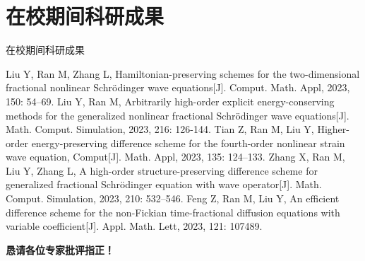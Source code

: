 \documentclass[aspectratio=169]{beamer}
\numberwithin{theorem}{section} %
\begin{document}
\section*{在校期间科研成果}
\begin{frame}{在校期间科研成果}\footnotesize
	\begin{thebibliography}{99}  
	 Liu Y, Ran M, Zhang L, Hamiltonian-preserving schemes for the two-dimensional fractional nonlinear Schrödinger wave equations[J]. Comput. Math. Appl, 2023, 150: 54–69.
	 Liu Y, Ran M, Arbitrarily high-order explicit energy-conserving methods for the generalized nonlinear fractional Schrödinger wave equations[J]. Math. Comput. Simulation, 2023, 216: 126-144.
	 Tian Z, Ran M, Liu Y, Higher-order energy-preserving difference scheme for the fourth-order nonlinear strain wave equation, Comput[J]. Math. Appl, 2023, 135: 124–133.
	 Zhang X, Ran M, Liu Y, Zhang L, A high-order structure-preserving difference scheme for generalized fractional Schrödinger equation with wave operator[J]. Math. Comput. Simulation, 2023, 210: 532–546.
	 Feng Z, Ran M, Liu Y, An efficient difference scheme for the non-Fickian time-fractional diffusion equations with variable coefficient[J]. Appl. Math. Lett, 2023, 121: 107489.
	\end{thebibliography}
\end{frame}
 

\begin{frame}
\begin{center}
{\Huge\calligra \textbf{\textcolor[rgb]{0.227,0.373,0.306}{恳请各位专家批评指正！}}}
\end{center}
\end{frame}
\end{document}
